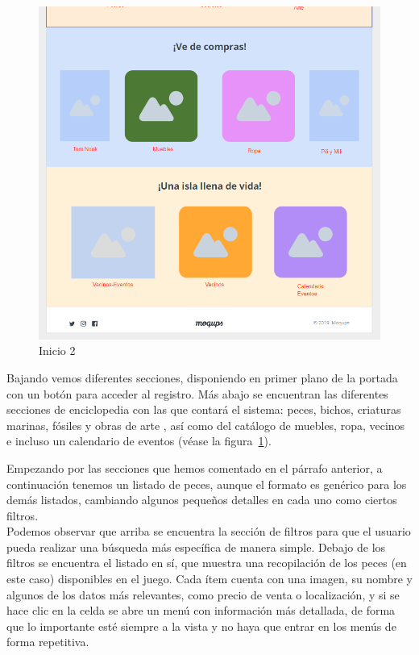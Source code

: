 \begin{figure}[!htb]
\begin{minipage}{0.48\textwidth}
		\includegraphics[width=\linewidth]{img/mockups/Inicio - 2.png}
		\caption{Inicio 2}
		\label{fig:inicio2}
	\end{minipage}
\end{figure}

Bajando vemos diferentes secciones, disponiendo en primer plano de la portada con un botón para acceder al registro. Más abajo se encuentran las diferentes secciones de enciclopedia con las que contará el sistema: peces, bichos, criaturas marinas, fósiles y obras de arte , así como del catálogo de muebles, ropa, vecinos e incluso un calendario de eventos {(v\'ease la figura~\ref{fig:inicio2})}.\\

\clearpage

Empezando por las secciones que hemos comentado en el párrafo anterior, a continuación tenemos un listado de peces, aunque el formato es genérico para los demás listados, cambiando algunos pequeños detalles en cada uno como ciertos filtros.\\

Podemos observar que arriba se encuentra la sección de filtros para que el usuario pueda realizar una búsqueda más específica de manera simple. Debajo de los filtros se encuentra el listado en sí, que muestra una recopilación de los peces (en este caso) disponibles en el juego. Cada ítem cuenta con una imagen, su nombre y algunos de los datos más relevantes, como precio de venta o localización, y si se hace clic en la celda se abre un menú con información más detallada, de forma que lo importante esté siempre a la vista y no haya que entrar en los menús de forma repetitiva.\\
 
